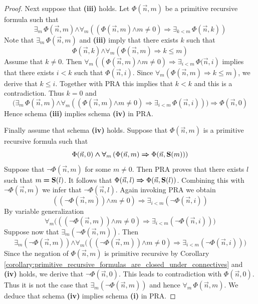 \documentclass[10pt]{amsart}
\newcommand{\mforall}{\boldsymbol{\forall}}
\newcommand{\mexists}{\boldsymbol{\exists}}
\newcommand{\mra}{\boldsymbol{\Rightarrow}}
\newcommand{\mand}{\boldsymbol{\wedge}}
\newcommand{\mneg}{\boldsymbol{\neg}}
\newcommand{\mle}{\boldsymbol{<}}
\newcommand{\mleq}{\boldsymbol{\leq}}
\newcommand{\meq}{\boldsymbol{=}}
\newcommand{\mneq}{\boldsymbol{\neq}}
\begin{document}
\begin{proof}
	Next suppose that \textbf{(iii)} holds. Let $\Phi(\vec{n},m)$ be a primitive recursive formula such that
	$$\mexists_m\,\Phi(\vec{n},m) \mand \mforall_m\left((\Phi(\vec{n},m) \mand m \mneq 0) \mra \mexists_{k \mle m}\,\Phi(\vec{n},k)\right)$$
	Note that $\mexists_m\,\Phi(\vec{n},m)$ and \textbf{(iii)} imply that there exists $k$ such that
	$$\Phi(\vec{n},k) \mand \mforall_m\left(\Phi(\vec{n},m) \mra k \mleq m\right)$$
	Assume that $k \mneq 0$. Then $\mforall_m\left((\Phi(\vec{n},m) \mand m \mneq 0) \mra \mexists_{i \mle m}\,\Phi(\vec{n},i\right)$ implies that there exists $i \mle k$ such that $\Phi(\vec{n},i)$. Since $\mforall_m\left(\Phi(\vec{n},m) \mra k \mleq m\right)$, we derive that $k \mleq i$. Together with $\mathrm{PRA}$ this implies that $k \mle k$ and this is a contradiction. Thus $k \meq 0$ and
	$$\big(\mexists_m\,\Phi(\vec{n},m) \mand \mforall_m\left((\Phi(\vec{n},m) \mand m \mneq 0) \mra \mexists_{i \mle m}\,\Phi(\vec{n},i)\right)\big) \mra \Phi(\vec{n},0)$$
	Hence schema \textbf{(iii)} implies schema \textbf{(iv)} in $\mathrm{PRA}$.

	Finally assume that schema \textbf{(iv)} holds. Suppose that $\Phi(\vec{n},m)$ is a primitive recursive formula such that
	$$\Phi(\vec{n},0) \mand \mforall_m\left(\Phi(\vec{n},m) \mra \Phi(\vec{n},\bd{S}(m))\right)$$
	Suppose that $\mneg \Phi(\vec{n},m)$ for some $m \mneq 0$. Then $\mathrm{PRA}$ proves that there exists $l$ such that $m \meq \bd{S}(l)$. It follows that $\Phi(\vec{n},l) \mra \Phi(\vec{n},\bd{S}(l))$. Combining this with $\mneg \Phi(\vec{n},m)$ we infer that $\mneg \Phi(\vec{n},l)$. Again invoking $\mathrm{PRA}$ we obtain
	$$\left(\left(\mneg \Phi(\vec{n},m)\right) \mand m \mneq 0\right) \mra \mexists_{i \mle m}\left(\mneg \Phi(\vec{n},i)\right)$$
	By variable generalization
	$$\mforall_m\bigg(\left(\left(\mneg \Phi(\vec{n},m)\right) \mand m \mneq 0\right) \mra \mexists_{i \mle m}\left(\mneg \Phi(\vec{n},i)\right)\bigg)$$
	Suppose now that $\mexists_m\left(\mneg \Phi(\vec{n},m)\right)$. Then
	$$\mexists_m\left(\mneg \Phi(\vec{n},m)\right)\mand \mforall_m\bigg(\left(\left(\mneg \Phi(\vec{n},m)\right) \mand m \mneq 0\right) \mra \mexists_{i \mle m}\left(\mneg \Phi(\vec{n},i)\right)\bigg)$$
	Since the negation of $\Phi(\vec{n},m)$ is primitive recursive by Corollary \ref{corollary:primitive_recursive_formulas_are_closed_under_connectives} and \textbf{(iv)} holds, we derive that $\mneg \Phi(\vec{n},0)$. This leads to contradiction with $\Phi(\vec{n},0)$. Thus it is not the case that $\mexists_m\left(\mneg \Phi(\vec{n},m)\right)$ and hence $\mforall_m\,\Phi(\vec{n},m)$. We deduce that schema \textbf{(iv)} implies schema \textbf{(i)} in $\mathrm{PRA}$.
\end{proof}
\end{document}
